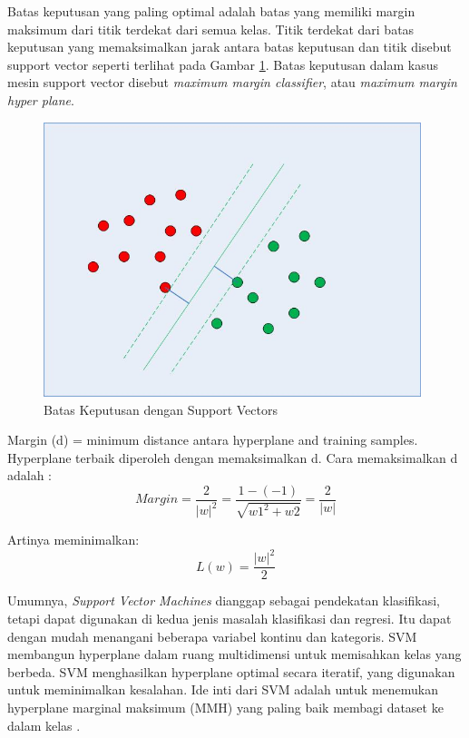 \par Batas keputusan yang paling optimal adalah batas yang memiliki margin maksimum dari titik terdekat dari semua kelas. Titik terdekat dari batas keputusan yang memaksimalkan jarak antara batas keputusan dan titik disebut support vector seperti terlihat pada Gambar \ref{svm2}. Batas keputusan dalam kasus mesin support vector disebut \textit{maximum margin classifier}, atau \textit{maximum margin hyper plane}.

\begin{figure}[H]
	\centering
	\includegraphics[width=11cm, height=8cm]{gambar/implementing-svm-kernel-svm-python-scikit-learn-2}
	\caption{Batas Keputusan dengan Support Vectors}
	\label{svm2}
\end{figure}

\par Margin (d) = minimum distance antara hyperplane and training samples. Hyperplane terbaik diperoleh dengan memaksimalkan d. Cara memaksimalkan d adalah :
\begin{equation}
	Margin = \frac{2}{|w|^2} = \frac{1-(-1)}{\sqrt{w{1}^2+w{2}}} = \frac{2}{|w|}
\end{equation}

Artinya meminimalkan:
\begin{equation}
	L(w)=\frac{|w|^2}{2}
\end{equation}

\par Umumnya, \textit{Support Vector Machines} dianggap sebagai pendekatan klasifikasi, tetapi dapat digunakan di kedua jenis masalah klasifikasi dan regresi. Itu dapat dengan mudah menangani beberapa variabel kontinu dan kategoris. SVM membangun hyperplane dalam ruang multidimensi untuk memisahkan kelas yang berbeda. SVM menghasilkan hyperplane optimal secara iteratif, yang digunakan untuk meminimalkan kesalahan. Ide inti dari SVM adalah untuk menemukan hyperplane marginal maksimum (MMH) yang paling baik membagi dataset ke dalam kelas \citep{Braun2011}.


